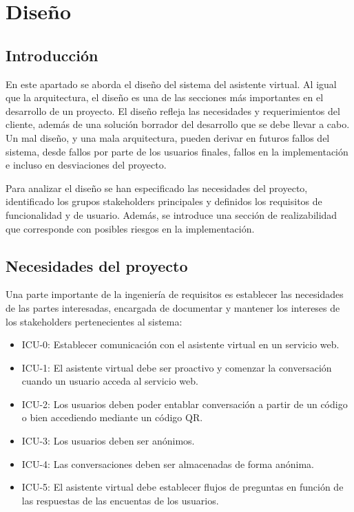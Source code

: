 \chapter{Diseño}
\label{chap:Design}


\section{Introducción}

En este apartado se aborda el diseño del sistema del asistente virtual. Al igual que la arquitectura, el diseño es una de las secciones más importantes en el desarrollo de un proyecto. El diseño refleja las necesidades y requerimientos del cliente, además de una solución borrador del desarrollo que se debe llevar a cabo. Un mal diseño, y una mala arquitectura, pueden derivar en futuros fallos del sistema, desde fallos por parte de los usuarios finales, fallos en la implementación e incluso en desviaciones del proyecto. 

Para analizar el diseño se han especificado las necesidades del proyecto, identificado los grupos stakeholders principales y definidos los requisitos de funcionalidad y de usuario. Además, se introduce una sección de realizabilidad que corresponde con posibles riesgos en la implementación.


\section{Necesidades del proyecto}

Una parte importante de la ingeniería de requisitos es establecer las necesidades de las partes interesadas, encargada de documentar y mantener los intereses de los stakeholders pertenecientes al sistema:

\begin{itemize}
    \item ICU-0: Establecer comunicación con el asistente virtual en un servicio web.
    \item ICU-1: El asistente virtual debe ser proactivo y comenzar la conversación cuando un usuario acceda al servicio web.
    \item ICU-2: Los usuarios deben poder entablar conversación a partir de un código o bien accediendo mediante un código QR.
    \item ICU-3: Los usuarios deben ser anónimos.
    \item ICU-4: Las conversaciones deben ser almacenadas de forma anónima.
    \item ICU-5: El asistente virtual debe establecer flujos de preguntas en función de las respuestas de las encuentas de los usuarios.
\end{itemize}

